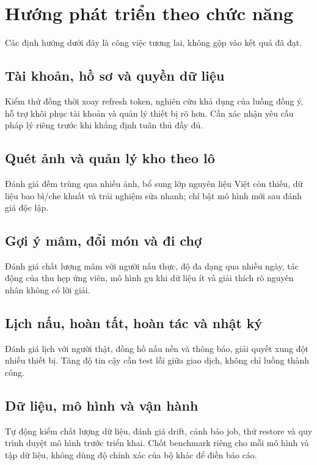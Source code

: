 \section{Hướng phát triển theo chức năng}
Các định hướng dưới đây là công việc tương lai, không gộp vào kết quả đã đạt.

\subsection{Tài khoản, hồ sơ và quyền dữ liệu}
Kiểm thử đồng thời xoay refresh token, nghiên cứu khả dụng của luồng đồng ý, hỗ trợ khôi phục tài khoản và quản lý thiết bị rõ hơn. Cần xác nhận yêu cầu pháp lý riêng trước khi khẳng định tuân thủ đầy đủ.

\subsection{Quét ảnh và quản lý kho theo lô}
Đánh giá đếm trùng qua nhiều ảnh, bổ sung lớp nguyên liệu Việt còn thiếu, dữ liệu bao bì/\allowbreak{}che khuất và trải nghiệm sửa nhanh; chỉ bật mô hình mới sau đánh giá độc lập.

\subsection{Gợi ý mâm, đổi món và đi chợ}
Đánh giá chất lượng mâm với người nấu thực, độ đa dạng qua nhiều ngày, tác động của thu hẹp ứng viên, mô hình gu khi dữ liệu ít và giải thích rõ nguyên nhân không có lời giải.

\subsection{Lịch nấu, hoàn tất, hoàn tác và nhật ký}
Đánh giá lịch với người thật, đồng hồ nấu nền và thông báo, giải quyết xung đột nhiều thiết bị. Tăng độ tin cậy cần test lỗi giữa giao dịch, không chỉ luồng thành công.

\subsection{Dữ liệu, mô hình và vận hành}
Tự động kiểm chất lượng dữ liệu, đánh giá drift, cảnh báo job, thử restore và quy trình duyệt mô hình trước triển khai. Chốt benchmark riêng cho mỗi mô hình và tập dữ liệu, không dùng độ chính xác của bộ khác để điền báo cáo.
